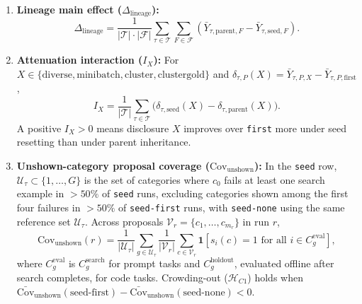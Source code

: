 \documentclass[10pt]{article}
\providecommand{\tightlist}{%
  \setlength{\itemsep}{0pt}\setlength{\parskip}{0pt}}
\begin{document}
\begin{enumerate}
\def\labelenumi{\arabic{enumi}.}
\tightlist
\item
  \textbf{Lineage main effect (\(\Delta_{\text{lineage}}\)):}
  \[\Delta_{\text{lineage}} = \frac{1}{|\mathcal{T}| \cdot |\mathcal{F}|} \sum_{\tau \in \mathcal{T}} \sum_{F \in \mathcal{F}} \left(\bar{Y}_{\tau,\text{parent},F} - \bar{Y}_{\tau,\text{seed},F}\right).\]
\item
  \textbf{Attenuation interaction (\(I_X\)):} For
  \(X \in \{\text{diverse}, \text{minibatch}, \text{cluster}, \text{clustergold}\}\)
  and
  \(\delta_{\tau,P}(X) = \bar{Y}_{\tau,P,X} - \bar{Y}_{\tau,P,\text{first}}\),
  \[I_X = \frac{1}{|\mathcal{T}|} \sum_{\tau \in \mathcal{T}} \big(\delta_{\tau,\text{seed}}(X) - \delta_{\tau,\text{parent}}(X)\big).\]
  A positive \(I_X > 0\) means disclosure \(X\) improves over
  \texttt{first} more under seed resetting than under parent
  inheritance.
\item
  \textbf{Unshown-category proposal coverage
  (\(\text{Cov}_{\text{unshown}}\)):} In the \texttt{seed} row,
  \(\mathcal{U}_\tau \subset \{1, \dots, G\}\) is the set of categories
  where \(c_0\) fails at least one search example in \(>50\%\) of
  \texttt{seed} runs, excluding categories shown among the first four
  failures in \(>50\%\) of \texttt{seed-first} runs, with
  \texttt{seed-none} using the same reference set \(\mathcal{U}_\tau\).
  Across proposals \(\mathcal{V}_r = \{c_1, \dots, c_{m_r}\}\) in run
  \(r\),
  \[\text{Cov}_{\text{unshown}}(r) = \frac{1}{|\mathcal{U}_\tau|} \sum_{g \in \mathcal{U}_\tau} \frac{1}{|\mathcal{V}_r|} \sum_{c \in \mathcal{V}_r} \mathbf{1}\!\left[s_i(c) = 1 \text{ for all } i \in C^{\text{eval}}_g\right],\]
  where \(C^{\text{eval}}_g\) is \(C^{\text{search}}_g\) for prompt
  tasks and \(C^{\text{holdout}}_g\), evaluated offline after search
  completes, for code tasks. Crowding-out (\(\mathcal{H}_{C1}\)) holds
  when
  \(\bar{\text{Cov}}_{\text{unshown}}(\text{seed-first}) - \bar{\text{Cov}}_{\text{unshown}}(\text{seed-none}) < 0\).
\end{enumerate}
\end{document}
